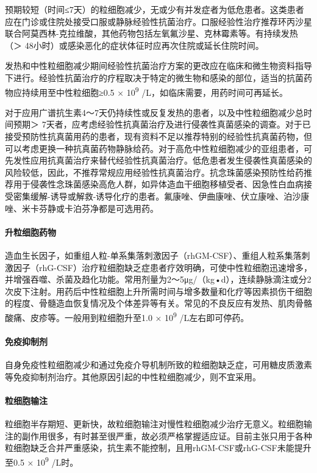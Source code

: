 预期较短（时间≤7天）的粒细胞减少，无或少有并发症者为低危患者。这类患者应在门诊或住院处接受口服或静脉经验性抗菌治疗。口服经验性治疗推荐环丙沙星联合阿莫西林-克拉维酸，其他药物包括左氧氟沙星、克林霉素等。有持续发热（＞
48小时）或感染恶化的症状体征时应再次住院或延长住院时间。

发热和中性粒细胞减少期间经验性抗菌治疗方案的更改应在临床和微生物资料指导下进行。经验性抗菌治疗的疗程取决于特定的微生物和感染的部位，适当的抗菌药物应持续用至中性粒细胞≥0.5
× 10\textsuperscript{9} /L，如临床需要，用药时间可再延长。

对于应用广谱抗生素4～7天仍持续性或反复发热的患者，以及中性粒细胞减少总时间预期＞
7天者，应考虑经验性抗真菌治疗及进行侵袭性真菌感染的调查。对于已接受预防性抗真菌用药的患者，现有资料不足以推荐特别的经验性抗真菌药物，但可以考虑更换一种抗真菌药物静脉给药。对于高危中性粒细胞减少的亚组患者，可先发性应用抗真菌治疗来替代经验性抗真菌治疗。低危患者发生侵袭性真菌感染的风险较低，因此，不推荐常规应用经验性抗真菌治疗。抗念珠菌感染预防性给药推荐用于侵袭性念珠菌感染高危人群，如异体造血干细胞移植受者、因急性白血病接受密集缓解-诱导或解救-诱导化疗的患者。氟康唑、伊曲康唑、伏立康唑、泊沙康唑、米卡芬静或卡泊芬净都是可选用药。

\paragraph{升粒细胞药物}

造血生长因子，如重组人粒-单系集落刺激因子（rhGM-CSF）、重组人粒系集落刺激因子（rhG-CSF）治疗粒细胞缺乏症患者疗效明确，可使中性粒细胞迅速增多，并增强吞噬、杀菌及趋化功能。常用剂量为2～5μg/（kg•d），连续静脉滴注或分2次皮下注射。用药后中性粒细胞上升所需时间与增多数量和化疗等因素损伤干细胞的程度、骨髓造血恢复情况及个体差异等有关。常见的不良反应有发热、肌肉骨骼酸痛、皮疹等。一般用到粒细胞升至1.0
× 10\textsuperscript{9} /L左右即可停药。

\paragraph{免疫抑制剂}

自身免疫性粒细胞减少和通过免疫介导机制所致的粒细胞缺乏症，可用糖皮质激素等免疫抑制剂治疗。其他原因引起的中性粒细胞减少，则不宜采用。

\paragraph{粒细胞输注}

粒细胞半存期短、更新快，故粒细胞输注对慢性粒细胞减少治疗无意义。粒细胞输注的副作用很多，有时甚至很严重，故必须严格掌握适应证。目前主张只用于各种粒细胞缺乏合并严重感染，抗生素不能控制，且用rhGM-CSF或rhG-CSF未能提升至0.5
× 10\textsuperscript{9} /L时。

